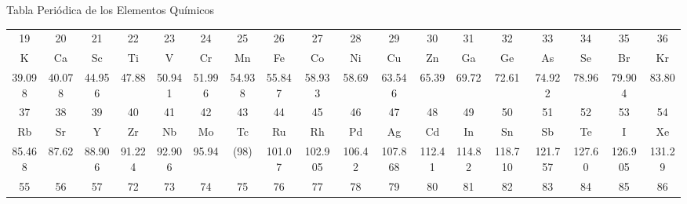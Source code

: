 \begin{infocard}{Tabla Periódica de los Elementos Químicos}
\begin{center}
\begin{tabular}{|c*{16}{|c}|c|}
            \small 19      & \small 20      & \small 21      & \small 22     & \small 23      & \small 24     & \small 25      & \small 26     & \small 27      & \small 28     & \small 29      & \small 30     & \small 31      & \small 32      & \small 33      & \small 34     & \small 35      & \small 36                         \\
            K              & Ca             & Sc             & Ti            & V              & Cr            & Mn             & Fe            & Co             & Ni            & Cu             & Zn            & Ga             & Ge             & As             & Se            & Br             & Kr                                \\[-2mm]
            \small 39.098  & \small 40.078  & \small 44.956  & \small 47.88  & \small 50.941  & \small 51.996 & \small 54.938  & \small 55.847 & \small 58.933  & \small 58.69  & \small 63.546  & \small 65.39  & \small 69.72   & \small 72.61   & \small 74.922  & \small 78.96  & \small 79.904  & \small 83.80                      \\[-1mm]
            \hline
            \small 37      & \small 38      & \small 39      & \small 40     & \small 41      & \small 42     & \small 43      & \small 44     & \small 45      & \small 46     & \small 47      & \small 48     & \small 49      & \small 50      & \small 51      & \small 52     & \small 53      & \small 54                         \\[-1mm]
            Rb             & Sr             & Y              & Zr            & Nb             & Mo            & Tc             & Ru            & Rh             & Pd            & Ag             & Cd            & In             & Sn             & Sb             & Te            & I              & Xe                                \\[-2mm]
            \small 85.468  & \small 87.62   & \small 88.906  & \small 91.224 & \small 92.906  & \small 95.94  & \small (98)    & \small 101.07 & \small 102.905 & \small 106.42 & \small 107.868 & \small 112.41 & \small 114.82  & \small 118.710 & \small 121.757 & \small 127.60 & \small 126.905 & \small 131.29                     \\[-1mm]
            \hline
            \small 55      & \small 56      & \small 57      & \small 72     & \small 73      & \small 74     & \small 75      & \small 76     & \small 77      & \small 78     & \small 79      & \small 80     & \small 81      & \small 82      & \small 83      & \small 84     & \small 85      & \small 86                         \\[-1mm]

\end{tabular}
\end{center}
\end{infocard}
